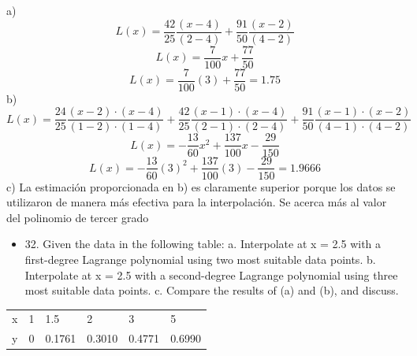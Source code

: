 \documentclass{article}
\begin{document}
a)
\begin{equation*}
    L(x) = \frac{42}{25}\frac{(x-4)}{(2-4)}+\frac{91}{50}\frac{(x-2)}{(4-2)}  
\end{equation*}
\begin{equation*}
    L(x) = \frac{7}{100}x+\frac{77}{50}
\end{equation*}
\begin{equation*}
    L(x) = \frac{7}{100}(3)+\frac{77}{50}=\boxed{1.75}
\end{equation*}
b)
\begin{equation*}
    L(x) = \frac{24}{25}\frac{(x-2) \cdot (x-4)}{(1-2) \cdot (1-4)}+\frac{42}{25}\frac{(x-1) \cdot (x-4)}{(2-1) \cdot (2-4)}+\frac{91}{50}\frac{(x-1) \cdot (x-2)}{(4-1) \cdot (4-2)}    
\end{equation*}
\begin{equation*}
    L(x) = -\frac{13}{60}x^2+\frac{137}{100}x-\frac{29}{150}
\end{equation*}
\begin{equation*}
    L(x) = -\frac{13}{60}(3)^2+\frac{137}{100}(3)-\frac{29}{150}=\boxed{1.9666}
\end{equation*}
c) La estimación proporcionada en b) es claramente superior porque los datos se utilizaron de manera más efectiva para la interpolación. Se acerca más al valor del polinomio de tercer grado  
\newpage
\begin{itemize}
    \item 32. Given the data in the following table:
          \newline a. Interpolate at x = 2.5 with a first-degree Lagrange polynomial
          using two most suitable data points.
          \newline b. Interpolate at x = 2.5 with a second-degree Lagrange polynomial
          using three most suitable data points.
          \newline c. Compare the results of (a) and (b), and discuss.
\end{itemize}

\begin{table}[h!]
    \begin{tabular}{|l|l|l|l|l|l|}
        \hline
        \multicolumn{1}{|p{30.865313pt}}{\raggedright x} & \multicolumn{1}{|p{30.865313pt}}{\raggedright 1} & \multicolumn{1}{|p{33.12375pt}}{\raggedright 1.5}    & \multicolumn{1}{|p{33.876564pt}}{\raggedright 2}      & \multicolumn{1}{|p{33.876564pt}}{\raggedright 3}      & \multicolumn{1}{|p{33.876564pt}|}{\raggedright 5}      \\
        \cline{1-6}
        \multicolumn{1}{|p{30.865313pt}}{\raggedright y} & \multicolumn{1}{|p{30.865313pt}}{\raggedright 0} & \multicolumn{1}{|p{33.12375pt}}{\raggedright 0.1761} & \multicolumn{1}{|p{33.876564pt}}{\raggedright 0.3010} & \multicolumn{1}{|p{33.876564pt}}{\raggedright 0.4771} & \multicolumn{1}{|p{33.876564pt}|}{\raggedright 0.6990} \\
        \hline
    \end{tabular}
\end{table}
\end{document}
